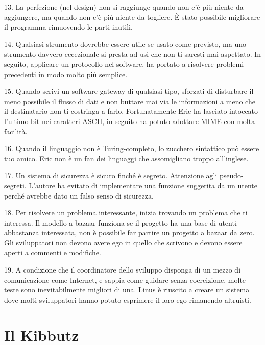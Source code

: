 \documentclass[a4paper,12pt,titlepage,oneside]{book}
\begin{document}
13. La perfezione (nel design) non si raggiunge quando non c'è più niente da aggiungere, ma quando non c'è più niente da togliere.
È stato possibile migliorare il programma rimuovendo le parti inutili.

14. Qualsiasi strumento dovrebbe essere utile se usato come previsto, ma uno strumento davvero eccezionale si presta ad usi che non ti saresti mai aspettato.
In seguito, applicare un protocollo nel software, ha portato a risolvere problemi precedenti in modo molto più semplice.

15. Quando scrivi un software gateway di qualsiasi tipo, sforzati di disturbare il meno possibile il flusso di dati e non buttare mai via le informazioni a meno che il destinatario non ti costringa a farlo.
Fortunatamente Eric ha lasciato intoccato l'ultimo bit nei caratteri ASCII, in seguito ha potuto adottare MIME con molta facilità.

16. Quando il linguaggio non è Turing-completo, lo zucchero sintattico può essere tuo amico.
Eric non è un fan dei linguaggi che assomigliano troppo all'inglese.

17. Un sistema di sicurezza è sicuro finché è segreto. Attenzione agli pseudo-segreti.
L'autore ha evitato di implementare una funzione suggerita da un utente perché avrebbe dato un falso senso di sicurezza.

18. Per risolvere un problema interessante, inizia trovando un problema che ti interessa.
Il modello a bazaar funziona se il progetto ha una base di utenti abbastanza interessata, non è possibile far partire un progetto a bazaar da zero. Gli sviluppatori non devono avere ego in quello che scrivono e devono essere aperti a commenti e modifiche.

19. A condizione che il coordinatore dello sviluppo disponga di un mezzo di comunicazione come Internet, e sappia come guidare senza coercizione, molte teste sono inevitabilmente migliori di una.
Linus è riuscito a creare un sistema dove molti sviluppatori hanno potuto esprimere il loro ego rimanendo altruisti.

\section{Il Kibbutz}
\end{document}
